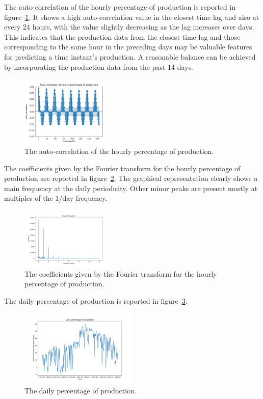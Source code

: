 The auto-correlation of the hourly percentage of production is reported in figure~\ref{fig:productioncorrelation}.
It shows a high auto-correlation value in the closest time lag and also at every 24 hours, with the value slightly decreasing as the lag increases over days.
This indicates that the production data from the closest time lag and those corresponding to the same hour in the preceding days may be valuable features for predicting a time instant's production.
A reasonable balance can be achieved by incorporating the production data from the past 14 days.

\begin{figure}[H]
\centering
\includegraphics[width=0.4\textwidth]{images/production/hourly_correlation_week_range}
\caption{The auto-correlation of the hourly percentage of production.}
\label{fig:productioncorrelation}
\end{figure}

The coefficients given by the Fourier transform for the hourly percentage of production are reported in figure~\ref{fig:productionft}.
The graphical representation clearly shows a main frequency at the daily periodicity.
Other minor peaks are present mostly at multiples of the 1/day frequency.

\begin{figure}[H]
\centering
\includegraphics[width=0.4\textwidth]{images/production/ft_hour_day}
\caption{The coefficients given by the Fourier transform for the hourly percentage of production.}
\label{fig:productionft}
\end{figure}

The daily percentage of production is reported in figure~\ref{fig:productiondataplotday}.

\begin{figure}[H]
\centering
\includegraphics[width=0.5\textwidth]{images/production/data_day_aggregated_plot}
\caption{The daily percentage of production.}
\label{fig:productiondataplotday}
\end{figure}

